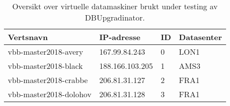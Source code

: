 \begin{table}[!h]
\caption{Oversikt over virtuelle datamaskiner brukt under testing av DBUpgradinator.}
\begin{center}
    \begin{tabular}{ | l | l | l | l |}
      \hline
      \textbf{Vertsnavn} & \textbf{IP-adresse} & \textbf{ID} & \textbf{Datasenter} \\ \hline
      vbb-master2018-avery & 167.99.84.243 & 0 & LON1 \\ \hline
      vbb-master2018-black & 188.166.103.205 & 1 & AMS3 \\ \hline
      vbb-master2018-crabbe & 206.81.31.127 & 2 & FRA1 \\ \hline
      vbb-master2018-dolohov & 206.81.31.128 & 3 & FRA1 \\ \hline
    \end{tabular}
\end{center}
\label{droplets}
\end{table}
